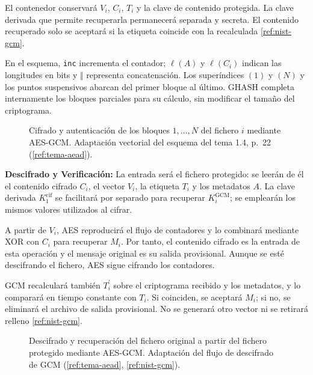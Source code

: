 El contenedor conservará $V_i$, $C_i$, $T_i$ y la clave de contenido protegida. La clave derivada que permite recuperarla permanecerá separada y secreta. El contenido recuperado solo se aceptará si la etiqueta coincide con la recalculada \ref{ref:nist-gcm}.

En el esquema, \texttt{inc} incrementa el contador; $\ell(A)$ y $\ell(C_i)$ indican las longitudes en bits y $\Vert$ representa concatenación. Los superíndices $(1)$ y $(N)$ y los puntos suspensivos abarcan del primer bloque al último. GHASH completa internamente los bloques parciales para su cálculo, sin modificar el tamaño del criptograma.

\clearpage
\begin{figure}[H]
  \centering
  \resizebox{!}{0.74\textheight}{}
  \caption{Cifrado y autenticación de los bloques $1,\ldots,N$ del fichero $i$ mediante AES-GCM. Adaptación vectorial del esquema del tema 1.4, p.~22 (\ref{ref:tema-aead}).}
  \label{fig:p2-aes-gcm}
\end{figure}

\textbf{Descifrado y Verificación:} La entrada será el fichero protegido: se leerán de él el contenido cifrado $C_i$, el vector $V_i$, la etiqueta $T_i$ y los metadatos $A$. La clave derivada $K_1^{\mathrm{cif}}$ se facilitará por separado para recuperar $K_i^{\mathrm{GCM}}$; se emplearán los mismos valores utilizados al cifrar.

\clearpage
A partir de $V_i$, AES reproducirá el flujo de contadores y lo combinará mediante XOR con $C_i$ para recuperar $M_i$. Por tanto, el contenido cifrado es la entrada de esta operación y el mensaje original es su salida provisional. Aunque se esté descifrando el fichero, AES sigue cifrando los contadores.

GCM recalculará también $T_i^{\prime}$ sobre el criptograma recibido y los metadatos, y lo comparará en tiempo constante con $T_i$. Si coinciden, se aceptará $M_i$; si no, se eliminará el archivo de salida provisional. No se generará otro vector ni se retirará relleno \ref{ref:nist-gcm}.

\begin{figure}[H]
  \centering
  \resizebox{!}{0.7\textheight}{}
  \caption{Descifrado y recuperación del fichero original a partir del fichero protegido mediante AES-GCM. Adaptación del flujo de descifrado de GCM (\ref{ref:tema-aead}, \ref{ref:nist-gcm}).}
  \label{fig:p2-aes-gcm-descifrado}
\end{figure}
\clearpage

